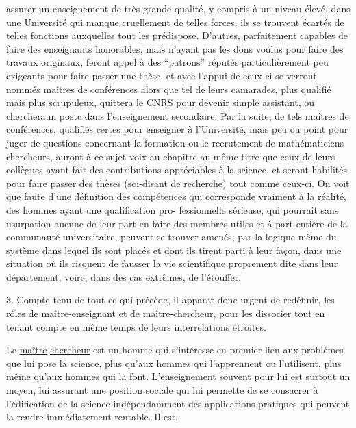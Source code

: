 
assurer un enseignement de très grande qualité, y compris à un niveau
élevé, dans une Université qui manque cruellement de telles forces, ils
se trouvent écartés de telles fonctions auxquelles tout les prédispose.
D'autres, parfaitement capables de faire des enseignants honorables, mais
n'ayant pas les dons voulus pour faire des travaux originaux, feront appel
à des ``patrons'' réputés particulièrement peu exigeants pour faire passer
une thèse, et avec l'appui de ceux-ci se verront nommés maîtres de conférences\hand{,}
alors que tel de leurs camarades, plus qualifié mais plus scrupuleux,
quittera le CNRS pour devenir simple assistant, ou chercheraun poste dans
l'enseignement secondaire. Par la suite, de tels maîtres de conférences,
qualifiés certes pour enseigner à l'Université, mais peu ou point pour juger
de questions concernant la formation ou le recrutement de mathématiciens
chercheurs, auront à ce sujet voix au chapitre au même titre que ceux de
leurs collègues ayant fait des contributions appréciables à la science, et
seront habilités pour faire passer des thèses (soi-disant de recherche)
tout comme ceux-ci. On voit que faute d'une définition des compétences qui
corresponde vraiment à la réalité, des hommes ayant une qualification pro-%
fessionnelle sérieuse, qui pourrait sans usurpation aucune de leur part en
faire des membres utiles et à part entière de la communauté universitaire,
peuvent se trouver amenés, par la logique même du système dans lequel ils
sont placés et dont ils tirent parti à leur façon, dans une situation où
ils risquent de fausser la vie scientifique proprement dite dans leur
département, voire, dans des cas extrêmes, de l'étouffer.

3. Compte tenu de tout ce qui précède, il apparat donc urgent de redéfinir,
les rôles de maître-enseignant et de maître-chercheur, pour les dissocier
tout en tenant compte en même temps de leurs interrelations étroites.

Le \uline{maître}-\uline{chercheur} est un homme qui s'intéresse en premier lieu
aux problèmes que lui pose la science, plus qu'aux hommes qui l'apprennent
ou l'utilisent, plus même qu'aux hommes qui la font. L'enseignement souvent
pour lui est surtout un moyen, lui assurant une position sociale qui lui
permette de se consacrer à l'édification de la science indépendamment des
applications pratiques qui peuvent la rendre immédiatement rentable. Il est,

